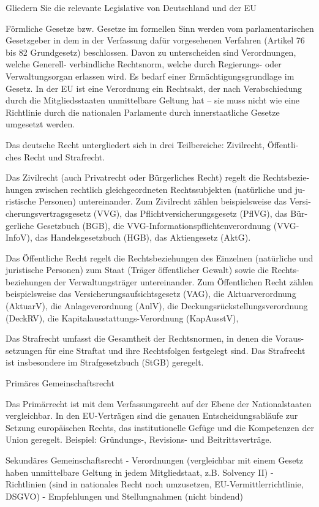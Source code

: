 Gliedern Sie die relevante Legislative von Deutschland und der EU

Förmliche Gesetze bzw. Gesetze im formellen Sinn werden vom parlamentarischen Gesetzgeber in dem in der Verfassung dafür
vorgesehenen Verfahren (Artikel 76 bis 82 Grundgesetz) beschlossen.
Davon zu unterscheiden sind Verordnungen, welche
Generell- verbindliche Rechtsnorm, welche durch Regierungs- oder Verwaltungsorgan erlassen wird.
Es bedarf einer Ermächtigungsgrundlage im Gesetz.
In der EU ist eine Verordnung ein Rechtsakt, der nach Verabschiedung durch die Mitgliedsstaaten unmittelbare Geltung hat –
sie muss nicht wie eine Richtlinie durch die nationalen Parlamente durch innerstaatliche Gesetze umgesetzt werden.

Das deutsche Recht untergliedert sich in drei Teilbereiche: Zivilrecht, Öffentli-
ches Recht und Strafrecht.

Das Zivilrecht (auch Privatrecht oder Bürgerliches Recht) regelt die Rechtsbezie-
hungen zwischen rechtlich gleichgeordneten Rechtssubjekten (natürliche und ju-
ristische Personen) untereinander. Zum Zivilrecht zählen beispielsweise das Versi-
cherungsvertragsgesetz (VVG), das Pflichtversicherungsgesetz (PflVG), das Bür-
gerliche Gesetzbuch (BGB), die VVG-Informationspflichtenverordnung (VVG-
InfoV), das Handelsgesetzbuch (HGB), das Aktiengesetz (AktG).

Das Öffentliche Recht regelt die Rechtsbeziehungen des Einzelnen (natürliche
und juristische Personen) zum Staat (Träger öffentlicher Gewalt) sowie die Rechts-
beziehungen der Verwaltungsträger untereinander. Zum Öffentlichen Recht zählen
beispielsweise das Versicherungsaufsichtsgesetz (VAG), die Aktuarverordnung
(AktuarV), die Anlageverordnung (AnlV), die Deckungsrückstellungsverordnung
(DeckRV), die Kapitalausstattungs-Verordnung (KapAusstV),

Das Strafrecht umfasst die Gesamtheit der Rechtsnormen, in denen die Voraus-
setzungen für eine Straftat und ihre Rechtsfolgen festgelegt sind. Das Strafrecht
ist insbesondere im Strafgesetzbuch (StGB) geregelt.

Primäres Gemeinschaftsrecht

Das Primärrecht ist mit dem Verfassungsrecht auf der Ebene der
Nationalstaaten vergleichbar. In den EU-Verträgen sind die genauen
Entscheidungsabläufe zur Setzung europäischen Rechts, das
institutionelle Gefüge und die Kompetenzen der Union geregelt.
Beispiel: Gründungs-, Revisions- und Beitrittsverträge.

Sekundäres Gemeinschaftsrecht
- Verordnungen (vergleichbar mit einem Gesetz haben unmittelbare Geltung in jedem Mitgliedstaat, z.B. Solvency II)
- Richtlinien (sind in nationales Recht noch umzusetzen, EU-Vermittlerrichtlinie, DSGVO)
- Empfehlungen und Stellungnahmen (nicht bindend)

